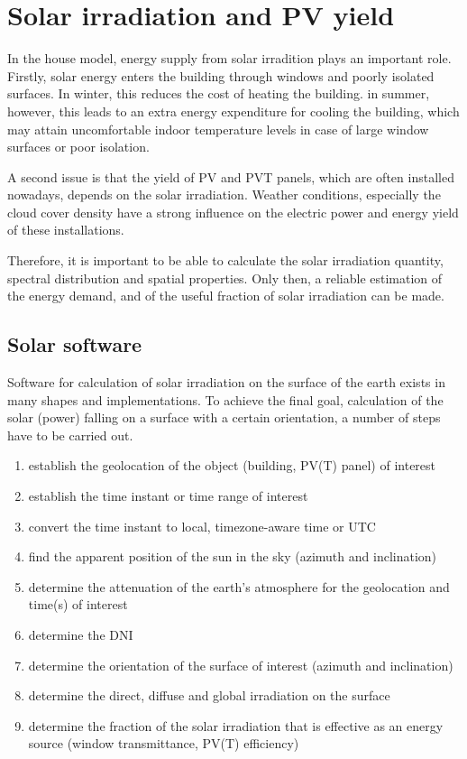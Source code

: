 \section{Solar irradiation and PV yield}

In the house model, energy supply from solar irradition plays an important role. Firstly, solar energy enters the building through windows and poorly isolated surfaces. In winter, this reduces the cost of heating the building. in summer, however, this leads to an extra energy expenditure for cooling the building, which may attain uncomfortable indoor temperature levels in case of large window surfaces or poor isolation.

A second issue is that the yield of PV and PVT panels, which are often installed nowadays, depends on the solar irradiation. Weather conditions, especially the cloud cover density have a strong influence on the electric power and energy yield of these installations.

Therefore, it is important to be able to calculate the solar irradiation quantity, spectral distribution and spatial properties. Only then, a reliable estimation of the energy demand, and of the useful fraction of solar irradiation can be made.

\subsection{Solar software}

Software for calculation of solar irradiation on the surface of the earth exists in many shapes and implementations. To achieve the final goal, calculation of the solar (power) falling on a surface with a certain orientation, a number of steps have to be carried out.

\begin{enumerate}
	\item establish the geolocation of the object (building, PV(T) panel) of interest
	\item establish the time instant or time range of interest
	\item convert the time instant to local, timezone-aware time or UTC
	\item find the apparent position of the sun in the sky (azimuth and inclination)
	\item determine the attenuation of the earth's atmosphere for the geolocation and time(s) of interest
	\item determine the DNI 
	\item determine the orientation of the surface of interest (azimuth and inclination)
	\item determine the direct, diffuse and global irradiation on the surface
	\item determine the fraction of the solar irradiation that is effective as an energy source (window transmittance, PV(T) efficiency)
\end{enumerate}

